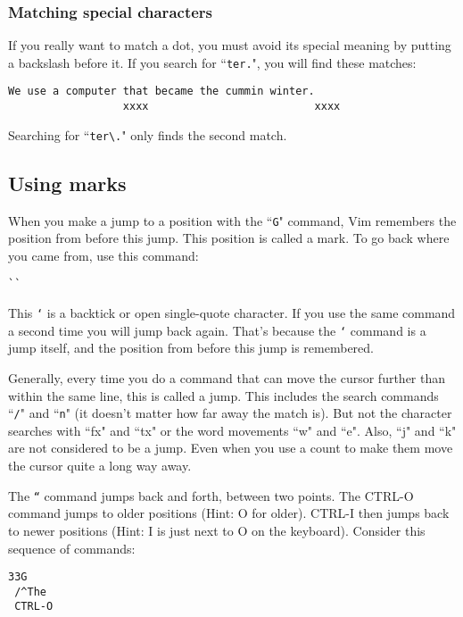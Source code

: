 \subsubsection{Matching special characters}

If you really want to match a dot, you must avoid its special meaning by putting a backslash before it.
If you search for ``\texttt{ter.}", you will find these matches:

		\begin{Verbatim}[samepage=true]
    We use a computer that became the cummin winter.
                  xxxx                          xxxx
		\end{Verbatim}

		Searching for ``\texttt{ter\textbackslash{}.}" only finds the second match.

\subsection{Using marks}

When you make a jump to a position with the ``\texttt{G}" command, Vim remembers the position from before this jump.
This position is called a mark.
To go back where you came from, use this command:

 \begin{Verbatim}[samepage=true]
 ``
 \end{Verbatim}

This \texttt{`} is a backtick or open single-quote character.
If you use the same command a second time you will jump back again.
That's because the \texttt{`} command is a jump itself, and the position from before this jump is remembered.

Generally, every time you do a command that can move the cursor further than within the same line, this is called a jump.
This includes the search commands ``\texttt{/}" and ``\texttt{n}" (it doesn't matter how far away the match is).
But not the character searches with ``fx" and ``tx" or the word movements ``w" and ``e".
Also, ``j" and ``k" are not considered to be a jump.
Even when you use a count to make them move the cursor quite a long way away.

The \texttt{``} command jumps back and forth, between two points.
The CTRL-O command jumps to older positions (Hint: O for older).
CTRL-I then jumps back to newer positions (Hint: I is just next to O on the keyboard).
Consider this sequence of commands:

 \begin{Verbatim}[samepage=true]
 33G
 /^The
 CTRL-O
 \end{Verbatim}

